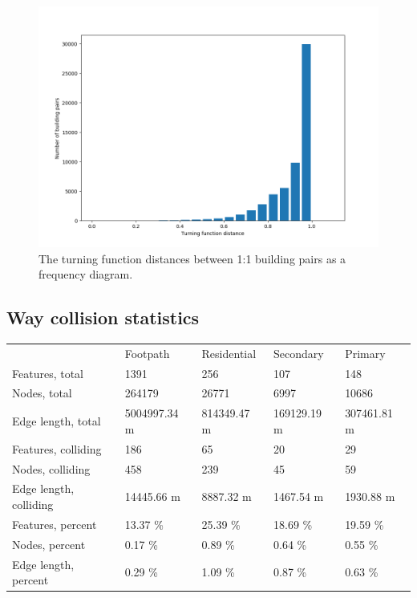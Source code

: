 \documentclass[a4paper]{article}
\begin{document}

\begin{figure}[H]
    \centering
    \includegraphics[width=\textwidth,height=0.5\textheight,keepaspectratio]{img_turning_function_plot}
    \caption{The turning function distances between 1:1 building pairs as a frequency diagram.}
    \label{fig:space}
\end{figure}


\subsection{Way collision statistics}

\begin{table}[H]
\begin{tabular}{lllll}
                            & Footpath      & Residential  & Secondary   & Primary     \\
    Features, total         & 1391          & 256          & 107         & 148         \\
    Nodes, total            & 264179        & 26771        & 6997        & 10686       \\
    Edge length, total      & 5004997.34 m  & 814349.47 m  & 169129.19 m & 307461.81 m \\
    Features, colliding     & 186           & 65           & 20          & 29          \\
    Nodes, colliding        & 458           & 239          & 45          & 59          \\
    Edge length, colliding  & 14445.66 m    & 8887.32 m    & 1467.54 m   & 1930.88 m   \\
    Features, percent       & 13.37 \%      & 25.39 \%     & 18.69 \%    & 19.59 \%    \\
    Nodes, percent          & 0.17 \%       & 0.89 \%      & 0.64 \%     & 0.55 \%     \\
    Edge length, percent    & 0.29 \%       & 1.09 \%      & 0.87 \%     & 0.63 \%

\end{tabular}
\end{table}
\end{document}
